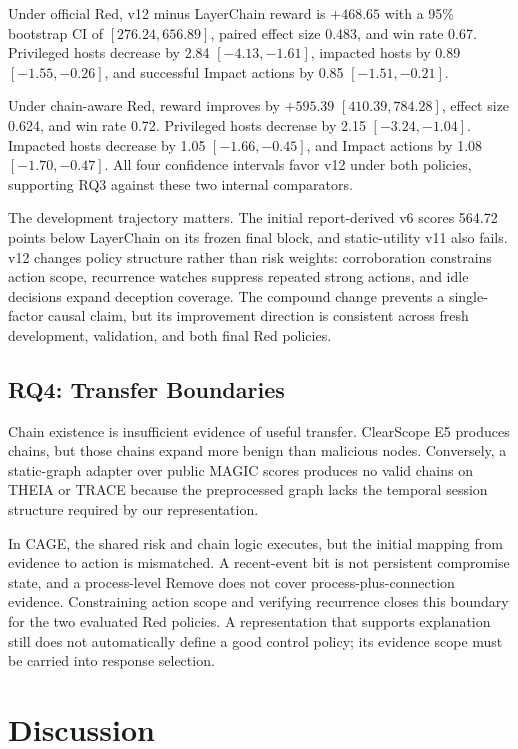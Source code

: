 \documentclass[runningheads]{llncs}
\begin{document}
Under official Red, v12 minus LayerChain reward is $+468.65$ with a 95\% bootstrap CI of $[276.24,656.89]$, paired effect size 0.483, and win rate 0.67. Privileged hosts decrease by 2.84 $[-4.13,-1.61]$, impacted hosts by 0.89 $[-1.55,-0.26]$, and successful Impact actions by 0.85 $[-1.51,-0.21]$.

Under chain-aware Red, reward improves by $+595.39$ $[410.39,784.28]$, effect size 0.624, and win rate 0.72. Privileged hosts decrease by 2.15 $[-3.24,-1.04]$. Impacted hosts decrease by 1.05 $[-1.66,-0.45]$, and Impact actions by 1.08 $[-1.70,-0.47]$. All four confidence intervals favor v12 under both policies, supporting RQ3 against these two internal comparators.

The development trajectory matters. The initial report-derived v6 scores 564.72 points below LayerChain on its frozen final block, and static-utility v11 also fails. v12 changes policy structure rather than risk weights: corroboration constrains action scope, recurrence watches suppress repeated strong actions, and idle decisions expand deception coverage. The compound change prevents a single-factor causal claim, but its improvement direction is consistent across fresh development, validation, and both final Red policies.

\subsection{RQ4: Transfer Boundaries}

Chain existence is insufficient evidence of useful transfer. ClearScope E5 produces chains, but those chains expand more benign than malicious nodes. Conversely, a static-graph adapter over public MAGIC scores produces no valid chains on THEIA or TRACE because the preprocessed graph lacks the temporal session structure required by our representation.

In CAGE, the shared risk and chain logic executes, but the initial mapping from evidence to action is mismatched. A recent-event bit is not persistent compromise state, and a process-level Remove does not cover process-plus-connection evidence. Constraining action scope and verifying recurrence closes this boundary for the two evaluated Red policies. A representation that supports explanation still does not automatically define a good control policy; its evidence scope must be carried into response selection.

\section{Discussion}
\end{document}
